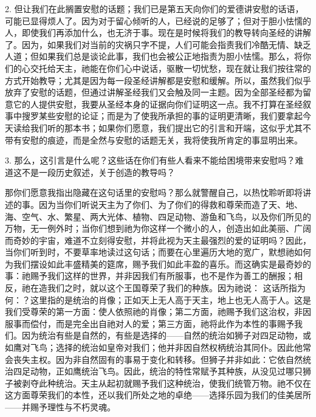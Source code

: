 2. 但让我们在此搁置安慰的话题；我们已是第五天向你们的爱德讲安慰的话语，可能已显得烦人了。因为对于留心倾听的人，已经说的足够了；但对于胆小怯懦的人，即使我们再添加什么，也无济于事。现在是时候将我们的教导转向圣经的讲解了。因为，如果我们对当前的灾祸只字不提，人们可能会指责我们冷酷无情、缺乏人道；但如果我们总是谈论此事，我们也会被公正地指责为胆小怯懦。那么，将你们的心交托给天主，祂能在你们心中说话，驱散一切忧愁，现在就让我们按往常的方式开始教导；尤其是因为每一段圣经讲解都是安慰和缓解。所以，虽然我们似乎放弃了安慰的话题，但通过讲解圣经我们又会触及同一主题。因为全部圣经都为留意它的人提供安慰，我要从圣经本身的证据向你们证明这一点。我不打算在圣经叙事中搜罗某些安慰的论证；而是为了使我所承担的事的证明更清晰，我们要拿起今天读给我们听的那本书；如果你们愿意，我们提出它的引言和开端，这似乎尤其不带有安慰的痕迹，而是全然与安慰的话题无关，我将使我所肯定的事显明出来。\par

3. 那么，这引言是什么呢？这些话在你们有些人看来不能给困境带来安慰吗？难道这不是一段历史叙述，关于创造的教导吗？\par

那你们愿意我指出隐藏在这句话里的安慰吗？那么就警醒自己，以热忱聆听即将讲述的事。因为当你们听说天主为了你们、为了你们的得救和尊荣而造了天、地、海、空气、水、繁星、两大光体、植物、四足动物、游鱼和飞鸟，以及你们所见的万物，无一例外时；当你们想到祂为你这样一个微小的人，创造出如此美丽、广阔而奇妙的宇宙，难道不立刻得安慰，并将此视为天主最强烈的爱的证明吗？因此，当你们听到时，不要草率地读过这句话；而要在心里遍历大地的宽广，默想祂如何为我们摆设如此丰盛精美的筵席，赐予我们如此丰盈的喜乐。而这确实是最奇妙的事：祂赐予我们这样的世界，并非因我们有所服事，也不是作为善工的酬报；相反，祂在造我们之时，就以这个王国尊荣了我们的种族。因为祂说： 这话所指为何：？这里指的是统治的肖像；正如天上无人高于天主，地上也无人高于人。这是我们受尊荣的第一方面：使人依照祂的肖像；第二方面，祂赐予我们这治权，非因服事而偿付，而是完全出自祂对人的爱；第三方面，祂将此作为本性的事赐予我们。因为统治有些是自然的，有些是选择的——自然的统治如狮子对四足动物，或如鹰对飞鸟；选择的统治如皇帝对我们；他并非因自然权柄统治其同仆。因此他常会丧失主权。因为非自然固有的事易于变化和转移。但狮子并非如此：它依自然统治四足动物，正如鹰统治飞鸟。因此，统治的特性常赋予其种族，从没见过哪只狮子被剥夺此种统治。天主从起初就赐予我们这种统治，使我们统管万物。祂不仅在这方面尊荣我们的本性，还以我们所处之地的卓绝——选择乐园为我们的佳美居所——并赐予理性与不朽灵魂。\par

